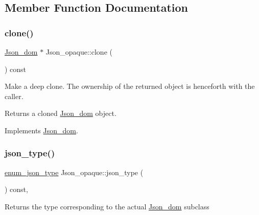 \subsection{Member Function Documentation}
\mbox{\label{classJson__opaque_ab40f723d80c2cfcaa4077fb4187c0fc8}} 
\subsubsection{\texorpdfstring{clone()}{clone()}}
{\footnotesize\ttfamily \mbox{\hyperlink{classJson__dom}{Json\+\_\+dom}} $\ast$ Json\+\_\+opaque\+::clone (\begin{DoxyParamCaption}{ }\end{DoxyParamCaption}) const\hspace{0.3cm}{\ttfamily [virtual]}}

Make a deep clone. The ownership of the returned object is henceforth with the caller.

\begin{DoxyReturn}{Returns}
a cloned \mbox{\hyperlink{classJson__dom}{Json\+\_\+dom}} object. 
\end{DoxyReturn}


Implements \mbox{\hyperlink{classJson__dom_a03c529d590cc4cdb747ccb82f4b70fb5}{Json\+\_\+dom}}.

\mbox{\label{classJson__opaque_a28fc1b6c4e0feab7897bf6bb810f7919}} 
\subsubsection{\texorpdfstring{json\+\_\+type()}{json\_type()}}
{\footnotesize\ttfamily \mbox{\hyperlink{classJson__dom_af37eed7dfe1da1d6507d3ab85320eb03}{enum\+\_\+json\+\_\+type}} Json\+\_\+opaque\+::json\+\_\+type (\begin{DoxyParamCaption}{ }\end{DoxyParamCaption}) const\hspace{0.3cm}{\ttfamily [inline]}, {\ttfamily [virtual]}}

\begin{DoxyReturn}{Returns}
the type corresponding to the actual \mbox{\hyperlink{classJson__dom}{Json\+\_\+dom}} subclass 
\end{DoxyReturn}


